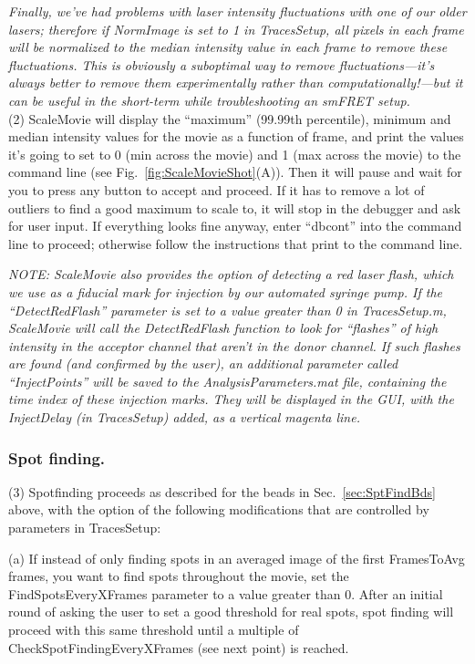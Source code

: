 \documentclass[11pt]{article}
\begin{document}
{\it Finally, we've had problems with laser intensity fluctuations with one of our older lasers; therefore if NormImage is set to 1 in TracesSetup, all pixels in each frame will be normalized to the median intensity value in each frame to remove these fluctuations. This is obviously a suboptimal way to remove fluctuations---it's always better to remove them experimentally rather than computationally!---but it can be useful in the short-term while troubleshooting an smFRET setup.} \\

\noindent (2) ScaleMovie will display the ``maximum'' (99.99th percentile), minimum and median intensity values for the movie as a function of frame, and print the values it's going to set to 0 (min across the movie) and 1 (max across the movie) to the command line (see Fig.~\ref{fig:ScaleMovieShot}(A)).  Then it will pause and wait for you to press any button to accept and proceed.  If it has to remove a lot of outliers to find a good maximum to scale to, it will stop in the debugger and ask for user input.  If everything looks fine anyway, enter ``dbcont'' into the command line to proceed; otherwise follow the instructions that print to the command line.

{\it NOTE: ScaleMovie also provides the option of detecting a red laser flash, which we use as a fiducial mark for injection by our automated syringe pump. If the ``DetectRedFlash'' parameter is set to a value greater than 0 in TracesSetup.m, ScaleMovie will call the DetectRedFlash function to look for ``flashes'' of high intensity in the acceptor channel that aren't in the donor channel. If such flashes are found (and confirmed by the user), an additional parameter called ``InjectPoints'' will be saved to the AnalysisParameters.mat file, containing the time index of these injection marks. They will be displayed in the GUI, with the InjectDelay (in TracesSetup) added, as a vertical magenta line.}

\subsubsection{Spot finding.}

\noindent (3) Spotfinding proceeds as described for the beads in Sec.~\ref{sec:SptFindBds} above, with the option of the following modifications that are controlled by parameters in TracesSetup:

(a) If instead of only finding spots in an averaged image of the first FramesToAvg frames, you want to find spots throughout the movie, set the FindSpotsEveryXFrames parameter to a value greater than 0.  After an initial round of asking the user to set a good threshold for real spots, spot finding will proceed with this same threshold until a multiple of CheckSpotFindingEveryXFrames (see next point) is reached.
\end{document}
